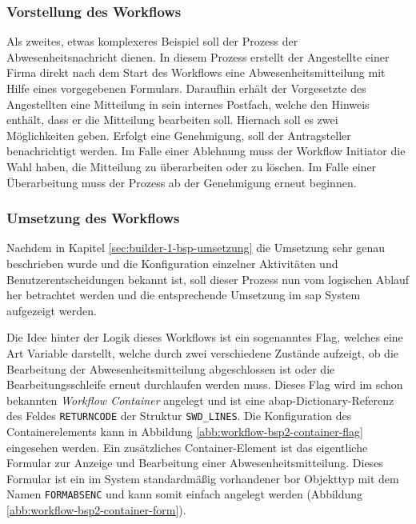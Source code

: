 \subsubsection{Vorstellung des Workflows}
\label{sec:builder-2-bsp-vorstellung}
Als zweites, etwas komplexeres Beispiel soll der Prozess der Abwesenheitsnachricht dienen. In diesem Prozess erstellt der Angestellte einer Firma direkt nach dem Start des Workflows eine Abwesenheitsmitteilung mit Hilfe eines vorgegebenen Formulars. Daraufhin erhält der Vorgesetzte des Angestellten eine Mitteilung in sein internes Postfach, welche den Hinweis enthält, dass er die Mitteilung bearbeiten soll. Hiernach soll es zwei Möglichkeiten geben. Erfolgt eine Genehmigung, soll der Antragsteller benachrichtigt werden. Im Falle einer Ablehnung muss der Workflow Initiator die Wahl haben, die Mitteilung zu überarbeiten oder zu löschen. Im Falle einer Überarbeitung muss der Prozess ab der Genehmigung erneut beginnen.

\subsubsection{Umsetzung des Workflows}
\label{sec:builder-2-bsp-umsetzung}
Nachdem in Kapitel \ref{sec:builder-1-bsp-umsetzung} die Umsetzung sehr genau beschrieben wurde und die Konfiguration einzelner Aktivitäten und Benutzerentscheidungen bekannt ist, soll dieser Prozess nun vom logischen Ablauf her betrachtet werden und die entsprechende Umsetzung im \gls{sap} System aufgezeigt werden.

Die Idee hinter der Logik dieses Workflows ist ein sogenanntes Flag, welches eine Art Variable darstellt, welche durch zwei verschiedene Zustände aufzeigt, ob die Bearbeitung der Abwesenheitsmitteilung abgeschlossen ist oder die Bearbeitungsschleife erneut durchlaufen werden muss. Dieses Flag wird im schon bekannten \textit{Workflow Container} angelegt und ist eine \gls{abap}-Dictionary-Referenz des Feldes \texttt{RETURNCODE} der Struktur \texttt{SWD\_LINES}. Die Konfiguration des Containerelements kann in Abbildung \ref{abb:workflow-bsp2-container-flag} eingesehen werden. Ein zusätzliches Container-Element ist das eigentliche Formular zur Anzeige und Bearbeitung einer Abwesenheitsmitteilung. Dieses Formular ist ein im System standardmäßig vorhandener \gls{bor} Objekttyp mit dem Namen \texttt{FORMABSENC} und kann somit einfach angelegt werden (Abbildung \ref{abb:workflow-bsp2-container-form}). 

